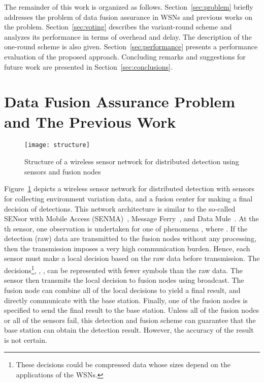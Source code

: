 \documentclass[12pt, onecolumn, draftcls]{IEEEtran}
\begin{document}
The remainder of this work is organized as follows.
Section~\ref{sec:problem} briefly addresses the problem of data
fusion assurance in WSNs and previous works on the problem.
Section~\ref{sec:voting} describes the variant-round scheme and
analyzes its performance in terms of overhead and delay. The
description of the one-round scheme is also given.
Section~\ref{sec:performance} presents a performance evaluation of
the proposed approach. Concluding remarks and suggestions for future
work are presented in Section~\ref{sec:conclusions}.

\section{Data Fusion Assurance Problem and The Previous Work}
\begin{figure}
\centering
\texttt{[image: structure]}
\caption{Structure of a wireless sensor network for distributed
detection using  sensors and  fusion nodes}
\label{fig:structure}
\end{figure}
\label{sec:problem}Figure~\ref{fig:structure} depicts a wireless
sensor network for distributed detection with  sensors for
collecting environment variation data, and a fusion center for
making a final decision of detections. This network architecture is
similar to the so-called SENsor with Mobile Access
(SENMA)~\cite{yang:misinformed,tong:senma}, Message
Ferry~\cite{zhao:ferrying}, and Data Mule~\cite{shah:mules}. At the
th sensor, one observation  is undertaken for one of
phenomena , where . If the detection (raw) data
are transmitted to the fusion nodes without any processing, then the
transmission imposes a very high communication burden. Hence, each
sensor must make a local decision based on the raw data before
transmission. The decisions\footnote{These decisions could be
compressed data whose sizes depend on the applications of the
WSNs.}, , , can be represented with fewer
symbols than the raw data. The sensor then transmits the local
decision to  fusion nodes using broadcast. The fusion node can
combine all of the local decisions to yield a final result, and
directly communicate with the base station. Finally, one of the
fusion nodes is specified to send the final result to the base
station. Unless all of the fusion nodes or all of the sensors fail,
this detection and fusion scheme can guarantee that the base station
can obtain the detection result. However, the accuracy of the result
is not certain.
\end{document}
